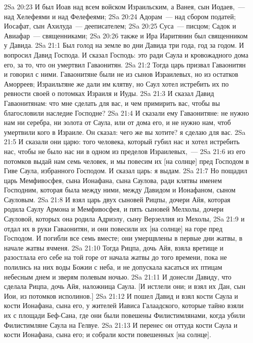 \vs 2Sa 20:23 И был Иоав  над всем войском Израильским, а Ванея, сын Иодаев,~--- над Хелефеями и над Фелефеями;
\vs 2Sa 20:24 Адорам~--- над сбором податей; Иосафат, сын Ахилуда~--- дееписателем;
\vs 2Sa 20:25 Суса~--- писцом; Садок и Авиафар~--- священниками;
\vs 2Sa 20:26 также и Ира Иаритянин был священником у Давида.
\vs 2Sa 21:1 Был голод на земле во дни Давида три года, год за годом. И вопросил Давид Господа. И сказал Господь: это ради Саула и кровожадного дома его, за то, что он умертвил Гаваонитян.
\vs 2Sa 21:2 Тогда царь призвал Гаваонитян и говорил с ними. Гаваонитяне были не из сынов Израилевых, но из остатков Аморреев; Израильтяне же дали им клятву, но Саул хотел истребить их по ревности своей о потомках Израиля и Иуды.
\vs 2Sa 21:3 И сказал Давид Гаваонитянам: что мне сделать для вас, и чем примирить вас, чтобы вы благословили наследие Господне?
\vs 2Sa 21:4 И сказали ему Гаваонитяне: не нужно нам ни серебра, ни золота от Саула, или от дома его, и не нужно нам, чтоб умертвили кого в Израиле. Он сказал: чего же вы хотите? я сделаю для вас.
\vs 2Sa 21:5 И сказали они царю: того человека, который губил нас и хотел истребить нас, чтобы не было нас ни в одном из пределов Израилевых,~---
\vs 2Sa 21:6 из его потомков выдай нам семь человек, и мы повесим их [на солнце] пред Господом в Гиве Саула, избранного Господом. И сказал царь: я выдам.
\vs 2Sa 21:7 Но пощадил царь Мемфивосфея, сына Ионафана, сына Саулова, ради клятвы именем Господним, которая была между ними, между Давидом и Ионафаном, сыном Сауловым.
\vs 2Sa 21:8 И взял царь двух сыновей Рицпы, дочери Айя, которая родила Саулу Армона и Мемфивосфея, и пять сыновей Мелхолы, дочери Сауловой, которых она родила Адриэлу, сыну Верзеллия из Мехолы,
\vs 2Sa 21:9 и отдал их в руки Гаваонитян, и они повесили их [на солнце] на горе пред Господом. И погибли все семь вместе; они умерщвлены в первые дни жатвы, в начале жатвы ячменя.
\vs 2Sa 21:10 Тогда Рицпа, дочь Айя, взяла вретище и разостлала его себе на той горе  от начала жатвы до того времени, пока не полились на них воды Божии с неба, и не допускала касаться их птицам небесным днем и зверям полевым ночью.
\vs 2Sa 21:11 И донесли Давиду, что сделала Рицпа, дочь Айя, наложница Саула. [И истлели они; и взял их Дан, сын Иои, из потомков исполинов.]
\vs 2Sa 21:12 И пошел Давид и взял кости Саула и кости Ионафана, сына его, у жителей Иависа Галаадского, которые тайно взяли их с площади Беф-Сана, где они были повешены Филистимлянами, когда убили Филистимляне Саула на Гелвуе.
\vs 2Sa 21:13 И перенес он оттуда кости Саула и кости Ионафана, сына его; и собрали кости повешенных [на солнце].
